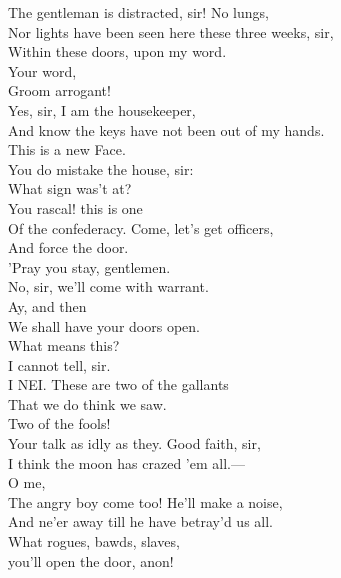 \documentclass[a4paper,oneside]{memoir}
\begin{document}
\begin{drama*}
\facespeaks The gentleman is distracted, sir! No lungs,\\
Nor lights have been seen here these three weeks, sir,\\
Within these doors, upon my word.\\
\surlyspeaks {} Your word,\\
Groom arrogant!\\
\facespeaks {} Yes, sir, I am the housekeeper,\\
And know the keys have not been out of my hands.\\
\surlyspeaks This is a new Face.\\
\facespeaks {} You do mistake the house, sir:\\
What sign was't at?\\
\surlyspeaks {} You rascal! this is one\\
Of the confederacy. Come, let's get officers,\\
And force the door.\\
\lovewitspeaks {} 'Pray you stay, gentlemen.\\
\surlyspeaks No, sir, we'll come with warrant.\\
\mammonspeaks {} Ay, and then\\
We shall have your doors open.\\
\lovewitspeaks {} What means this?\\
\facespeaks I cannot tell, sir.\\
I NEI. These are two of the gallants\\
That we do think we saw.\\
\facespeaks {} Two of the fools!\\
Your talk as idly as they. Good faith, sir,\\
I think the moon has crazed 'em all.---\\
O me,\\
The angry boy come too! He'll make a noise,\\
And ne'er away till he have betray'd us all.\\
\kastrilspeaks {} What rogues, bawds, slaves,\\
you'll open the door, anon!\\

\end{drama*}
\end{document}
